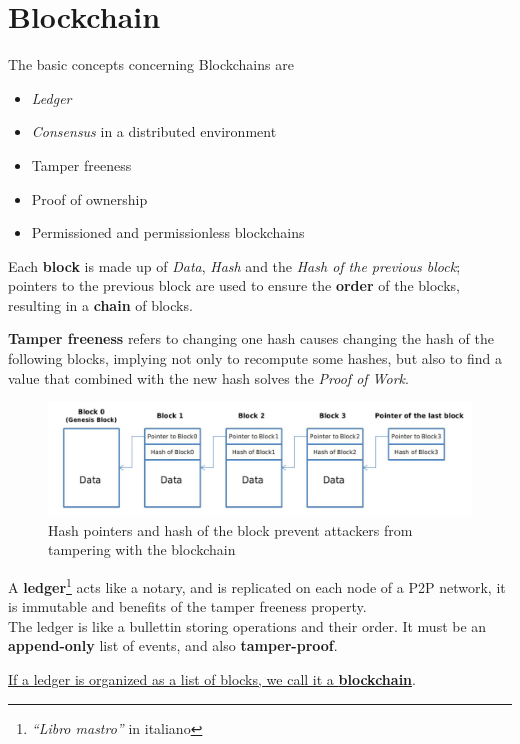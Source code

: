 \chapter{Blockchain}
The basic concepts concerning Blockchains are
\begin{itemize}
   \item \textit{Ledger}
   \item \textit{Consensus} in a distributed environment
   \item Tamper freeness
   \item Proof of ownership
   \item Permissioned and permissionless blockchains
\end{itemize}

Each \textbf{block} is made up of \textit{Data}, \textit{Hash} and the \textit{Hash of the previous block}; pointers to the previous block are used to ensure the \textbf{order} of the blocks, resulting in a \textbf{chain} of blocks.

\textbf{Tamper freeness} refers to changing one hash causes changing the hash of the following blocks, implying not only to recompute some hashes, but also to find a value that combined with the new hash solves the \textit{Proof of Work}.

\begin{figure}[htbp]
   \centering
   \includegraphics{images/hashpointers.png}
   \caption{Hash pointers and hash of the block prevent attackers from tampering with the blockchain}
   \label{fig:hashpointers}
\end{figure}

A \textbf{ledger}\footnote{\textit{``Libro mastro''} in italiano} acts like a notary, and is replicated on each node of a P2P network, it is immutable and benefits of the tamper freeness property.\\
The ledger is like a bullettin storing operations and their order. It must be an \textbf{append-only} list of events, and also \textbf{tamper-proof}.

\begin{center}
   \ul{If a ledger is organized as a list of blocks, we call it a \textbf{blockchain}}.
\end{center}
\nl

